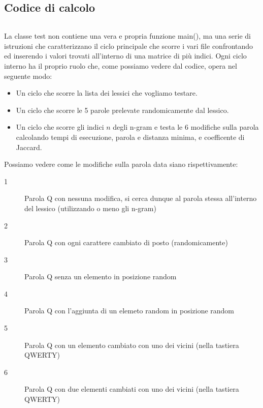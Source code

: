 \documentclass{article}
\begin{document}
\subsection{Codice di calcolo}
\inputminted{python}{python.py}
La classe test non contiene una vera e propria funzione main(), ma una serie di istruzioni che caratterizzano il ciclo principale che scorre i vari file confrontando ed inserendo i valori trovati all'interno di una matrice di più indici. Ogni ciclo interno ha il proprio ruolo che, come possiamo vedere dal codice, opera nel seguente modo:
\begin{itemize}
    \item Un ciclo che scorre la lista dei lessici che vogliamo testare.
    \item Un ciclo che scorre le 5 parole prelevate randomicamente dal lessico. 
    \item Un ciclo che scorre gli indici $n$ degli n-gram e testa le 6 modifiche sulla parola calcolando tempi di esecuzione, parola e distanza minima, e coefficente di Jaccard.
\end{itemize}
Possiamo vedere come le modifiche sulla parola data siano rispettivamente:
\begin{description}
    \item[1] Parola Q con nessuna modifica, si cerca dunque al parola stessa all'interno del lessico (utilizzando o meno gli n-gram)
    \item[2] Parola Q con ogni carattere cambiato di posto (randomicamente)
    \item[3] Parola Q senza un elemento in posizione random
    \item[4] Parola Q con l'aggiunta di un elemeto random in posizione random
    \item[5] Parola Q con un elemento cambiato con uno dei vicini (nella tastiera QWERTY)
    \item[6] Parola Q con due elementi cambiati con uno dei vicini (nella tastiera QWERTY)
\end{description}

\newpage
\end{document}
